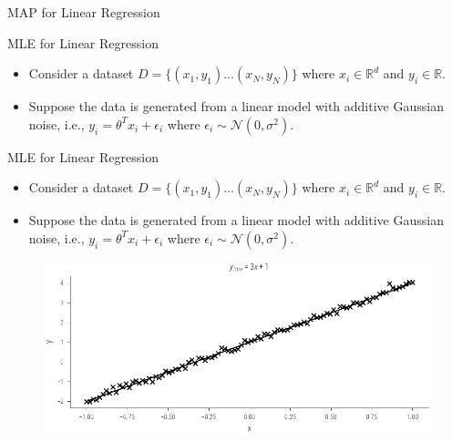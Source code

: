 \documentclass{beamer}
\begin{document}
\begin{section}{MAP for Linear Regression}
    \begin{frame}{MLE for Linear Regression}
        \begin{itemize}
            \item Consider a dataset $D = \{ (x_1, y_1) ... (x_N, y_N) \}$ where $x_i \in \mathbb{R}^d$ and $y_i \in \mathbb{R}$.
            \pause
            \item Suppose the data is generated from a linear model with additive Gaussian noise, i.e., $y_i = \theta^T x_i + \epsilon_i$ where $\epsilon_i \sim \mathcal{N}(0, \sigma^2)$.
        \end{itemize}
        \pause
    \end{frame}

    \begin{frame}{MLE for Linear Regression}
        \begin{itemize}
            \item Consider a dataset $D = \{ (x_1, y_1) ... (x_N, y_N) \}$ where $x_i \in \mathbb{R}^d$ and $y_i \in \mathbb{R}$.
            \item Suppose the data is generated from a linear model with additive Gaussian noise, i.e., $y_i = \theta^T x_i + \epsilon_i$ where $\epsilon_i \sim \mathcal{N}(0, \sigma^2)$.
        \end{itemize}
        \begin{figure}
            \centerline{\includegraphics[scale = 0.75]{../figures/map/linreg_data.pdf}}
        \end{figure}
        

\end{frame}
\end{section}
\end{document}
